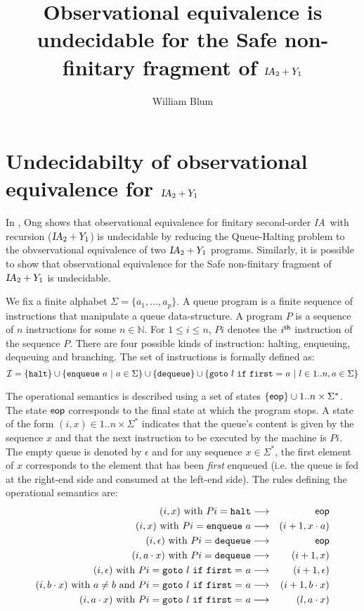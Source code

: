 \documentclass{article}
\author{William Blum}
\title{Observational equivalence is undecidable for the Safe non-finitary fragment of $\ialgol_2 + Y_1$}
\newcommand\nat{\mathbb{N}}
\newcommand\eop{{\sf eop}}
\newcommand\ialgol{{\textsl{IA}}}
\begin{document}
\maketitle

\section{Undecidabilty of observational equivalence for $\ialgol_2 + Y_1$}

In \cite{Ong02}, Ong shows that observational equivalence for finitary second-order \ialgol\ with recursion ($\ialgol_2 + Y_1$) is undecidable by reducing the Queue-Halting problem to the obvservational equivalence of two $\ialgol_2 + Y_1$ programs. Similarly, it is possible to show that observational equivalence for the Safe non-finitary fragment of $\ialgol_2 + Y_1$ is undecidable.


We fix a finite alphabet $\Sigma = \{ a_1, \ldots, a_p \}$. A queue program is a finite sequence of instructions that manipulate a queue data-structure. 
A program $P$ is a sequence of $n$ instructions for some $n\in \nat$. For $1 \leq i \leq n$, $P i$ denotes the $i^{\sf th}$ instruction of the sequence $P$. There are four possible kinds of instruction: halting, enqueuing, dequeuing and branching. The set of instructions is formally defined as:
$$ \mathcal{I} = \{ {\tt halt} \} \cup
\{ {\tt enqueue \ } a \ | \ a \in \Sigma \}
\cup \{ {\tt dequeue} \} \cup \{ {\tt goto\ } l {\tt\ if\ first =\ } a \ | \ l \in 1..n, a \in \Sigma \}
 $$


The operational semantics is described using a set of states $ \{ \eop \} \cup 1..n \times \Sigma^* $. The state $\eop$ corresponds to the final state at which the program stops. A state of the form $(i,x) \in 1..n \times \Sigma^*$ indicates that the queue's content is given by the sequence $x$ and that the next instruction to be executed by the machine is $P i$. The empty queue is denoted by $\epsilon$ and for any sequence $x \in \Sigma^*$, the first element of $x$ corresponds to the element that has been \emph{first} enqueued (i.e. the queue is fed at the right-end side and consumed at the left-end side). The rules defining the operational semantics are:
\begin{eqnarray*}
(i,x) \mbox{ with } P i = {\tt halt} &\longrightarrow& \eop \\
(i,x) \mbox{ with } P i = {\tt enqueue\ } a &\longrightarrow& (i+1,x \cdot a) \\
(i,\epsilon) \mbox{ with } P i = {\tt dequeue } &\longrightarrow& \eop \\
(i,a \cdot x) \mbox{ with } P i = {\tt dequeue } &\longrightarrow& (i+1,x) \\
(i,\epsilon) \mbox{ with } P i =  {\tt goto\ } l {\tt\ if\ first =\ } a &\longrightarrow& (i+1,\epsilon) \\
(i,b \cdot x) \mbox{ with } a \neq b \mbox{ and } P i =  {\tt goto\ } l {\tt\ if\ first =\ } a &\longrightarrow& (i+1,b \cdot x) \\
(i,a \cdot x) \mbox{ with } P i =  {\tt goto\ } l {\tt\ if\ first =\ } a &\longrightarrow& (l,a \cdot x)
\end{eqnarray*}
\end{document}
